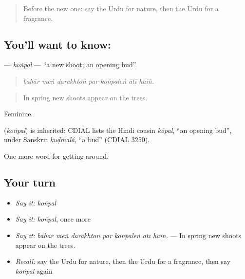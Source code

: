\label{lesson:UR-C436-konpal}



\begin{quote}
Before the new one: say the Urdu for nature, then the Urdu for a fragrance.
\end{quote}

\subsection*{You'll want to know: }
\textbf{} — \emph{koṅpal} — \textquotedblleft{}a new shoot; an opening bud\textquotedblright{}.

\begin{quote}
      
\end{quote}

\begin{quote}
\emph{bahār meṅ darakhtoṅ par koṅpaleṅ ātī haiṅ.}
\end{quote}

\begin{quote}
In spring new shoots appear on the trees.
\end{quote}

Feminine.

\begin{cousinweb}
\textbf{} (\emph{koṅpal}) is inherited: CDIAL lists the Hindi cousin \emph{kõpal}, \textquotedblleft{}an opening bud\textquotedblright{}, under Sanskrit \emph{kuḍmalá}, \textquotedblleft{}a bud\textquotedblright{} (CDIAL 3250).
\end{cousinweb}

\begin{grammarlens}[title={What you've built}]
One more word for getting around.
\end{grammarlens}

\subsection*{Your turn}
\begin{itemize}
\raggedright
  \item \emph{Say it:} \emph{koṅpal}
  \item \emph{Say it:} \emph{koṅpal}, once more
  \item \emph{Say it:} \emph{bahār meṅ darakhtoṅ par koṅpaleṅ ātī haiṅ.} — In spring new shoots appear on the trees.
  \item \emph{Recall:} say the Urdu for nature, then the Urdu for a fragrance, then say \emph{koṅpal} again
\end{itemize}

